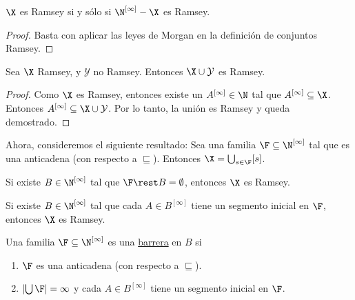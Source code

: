 \begin{teo}
    $\X$ es Ramsey si y sólo si $\N^{[\infty]} - \X$ es Ramsey.
\end{teo}

\begin{proof}
    Basta con aplicar las leyes de Morgan en la definición de conjuntos Ramsey.
\end{proof}

\begin{pro}
    Sea $\X$ Ramsey, y $\mathcal{Y}$ no Ramsey. Entonces $\X \cup \mathcal{Y}$ es Ramsey.
\end{pro}

\begin{proof}
    Como $\X$ es Ramsey, entonces existe un $A^{[\infty]} \in \N$ tal que $A^{[\infty]} \subseteq \X$. Entonces $A^{[\infty]} \subseteq \X \cup \mathcal{Y}$. Por lo tanto, la unión es Ramsey y queda demostrado.
\end{proof}

Ahora, consideremos el siguiente resultado: Sea una familia $\F \subseteq \N^{[\infty]}$ tal que es una anticadena (con respecto a $\sqsubseteq$). Entonces $\X = \bigcup_{s \in \F} [s]$.

Si existe $B \in \N^{[\infty]}$ tal que $\F \rest B = \emptyset$, entonces $\X$ es Ramsey.

Si existe $B \in \N^{[\infty]}$ tal que cada $A \in B^{[\infty]}$ tiene un segmento inicial en $\F$, entonces $\X$ es Ramsey.

\begin{defn}
    Una familia $\F \subseteq \N^{[\infty]}$ es una \ul{barrera} en $B$ si
    
    \begin{enumerate}
        \item $\F$ es una anticadena (con respecto a $\sqsubseteq$).
        \item $\left| \bigcup \F \right| = \infty$ y cada $A \in B^{[\infty]}$ tiene un segmento inicial en $\F$.
    \end{enumerate}
\end{defn}

